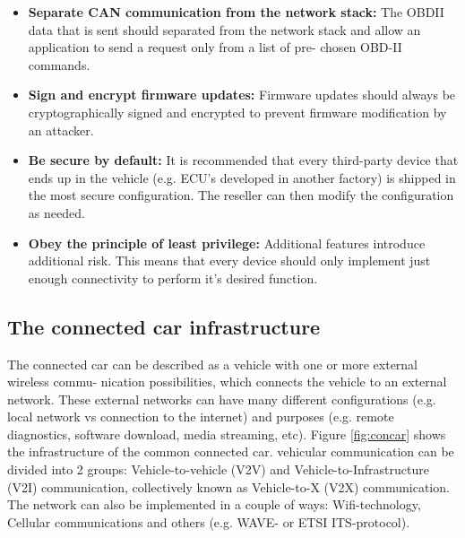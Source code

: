 \documentclass[11pt]{article}
\begin{document}
\begin{itemize}
	\item \textbf{Separate CAN communication from the network stack:} The OBDII data that is sent should separated from the network stack and allow an application to send a request only from a list of pre- chosen OBD-II commands.
	
	\item \textbf{Sign and encrypt firmware updates:} Firmware updates should always be cryptographically signed and encrypted to prevent firmware modification by an attacker.
	
	\item \textbf{Be secure by default:} It is recommended that every third-party device that ends up in the vehicle (e.g. ECU's developed in another factory) is shipped in the most secure configuration. The reseller can then modify the configuration as needed.
	
	\item \textbf{Obey the principle of least privilege:} Additional features introduce additional risk. This means that every device should only implement just enough connectivity to perform it's desired function. 
\end{itemize}



\subsection{The connected car infrastructure}

The connected car can be described as a vehicle with one or more external wireless commu- nication possibilities, which connects the vehicle to an external network. These external networks can have many different configurations (e.g. local network vs connection to the internet) and purposes (e.g. remote diagnostics, software download, media streaming, etc). Figure \ref{fig:concar} shows the infrastructure of the common connected car. vehicular communication can be divided into 2 groups:  Vehicle-to-vehicle (V2V) and Vehicle-to-Infrastructure (V2I) communication, collectively known as Vehicle-to-X
(V2X) communication. The network can also be implemented in a couple of ways: Wifi-technology, Cellular communications and others (e.g. WAVE- or ETSI ITS-protocol).
\end{document}
